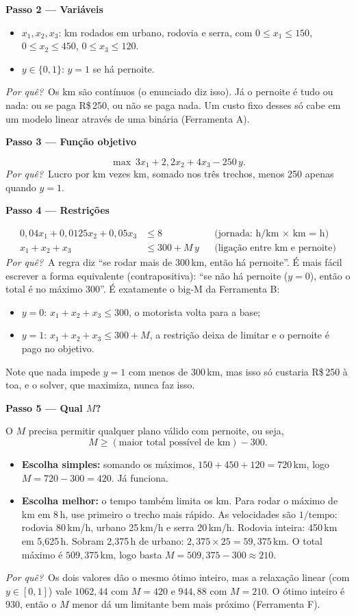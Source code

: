 \documentclass[11pt,a4paper]{article}
\newcommand{\passo}[1]{\par\medskip\textbf{#1}\par}
\newcommand{\porque}{\textit{Por quê?}\ }
\begin{document}
\passo{Passo 2 --- Variáveis}
\begin{itemize}
  \item $x_1, x_2, x_3$: km rodados em urbano, rodovia e serra, com $0\le x_1\le150$, $0\le x_2\le450$,
        $0\le x_3\le120$.
  \item $y\in\{0,1\}$: $y=1$ se há pernoite.
\end{itemize}
\porque Os km são contínuos (o enunciado diz isso). Já o pernoite é tudo ou nada: ou se paga R\$\,250, ou não se
paga nada. Um custo fixo desses só cabe em um modelo linear através de uma binária (Ferramenta A).

\passo{Passo 3 --- Função objetivo}
\[
  \max\ 3x_1 + 2{,}2x_2 + 4x_3 - 250\,y .
\]
\porque Lucro por km vezes km, somado nos três trechos, menos 250 apenas quando $y=1$.

\passo{Passo 4 --- Restrições}
\begin{align*}
  0{,}04x_1 + 0{,}0125x_2 + 0{,}05x_3 &\le 8 && \text{(jornada: h/km $\times$ km = h)}\\
  x_1 + x_2 + x_3 &\le 300 + M\,y && \text{(ligação entre km e pernoite)}
\end{align*}
\porque A regra diz ``se rodar mais de 300\,km, então há pernoite''. É mais fácil escrever a forma
equivalente (contrapositiva): ``se não há pernoite ($y=0$), então o total é no máximo 300''. É exatamente o
big-M da Ferramenta B:
\begin{itemize}
  \item $y=0$: $x_1+x_2+x_3\le300$, o motorista volta para a base;
  \item $y=1$: $x_1+x_2+x_3\le300+M$, a restrição deixa de limitar e o pernoite é pago no objetivo.
\end{itemize}
Note que nada impede $y=1$ com menos de 300\,km, mas isso só custaria R\$\,250 à toa, e o solver, que
maximiza, nunca faz isso.

\passo{Passo 5 --- Qual $M$?}
O $M$ precisa permitir qualquer plano válido com pernoite, ou seja,
\[
  M \ge (\text{maior total possível de km}) - 300 .
\]
\begin{itemize}
  \item \textbf{Escolha simples:} somando os máximos, $150+450+120=720$\,km, logo $M=720-300=420$. Já funciona.
  \item \textbf{Escolha melhor:} o tempo também limita os km. Para rodar o máximo de km em 8\,h, use primeiro
        o trecho mais rápido. As velocidades são $1/\text{tempo}$: rodovia 80\,km/h, urbano 25\,km/h e serra 20\,km/h.
        Rodovia inteira: 450\,km em 5,625\,h. Sobram 2,375\,h de urbano: $2{,}375\times25=59{,}375$\,km. O total
        máximo é $509{,}375$\,km, logo basta $M=509{,}375-300\approx210$.
\end{itemize}
\porque Os dois valores dão o mesmo ótimo inteiro, mas a relaxação linear (com $y\in[0,1]$) vale
$1062{,}44$ com $M=420$ e $944{,}88$ com $M=210$. O ótimo inteiro é 930, então o $M$ menor dá um limitante
bem mais próximo (Ferramenta F).
\end{document}
